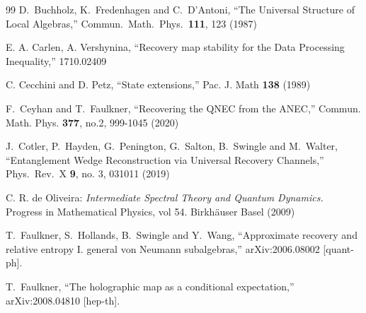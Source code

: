 \documentclass[english,a4paper,12pt]{article}
\begin{document}
\begin{thebibliography}{99}
  D.~Buchholz, K.~Fredenhagen and C.~D'Antoni,
  ``The Universal Structure of Local Algebras,''
  Commun.\ Math.\ Phys.\  {\bf 111}, 123 (1987)
  
  
  E. A. Carlen, A. Vershynina, ``Recovery map stability for the Data Processing Inequality,'' 1710.02409
  
  C. Cecchini and D. Petz, ``State extensions,'' Pac. J. Math {\bf 138} (1989)
  
  
F.~Ceyhan and T.~Faulkner,
``Recovering the QNEC from the ANEC,''
Commun. Math. Phys. \textbf{377}, no.2, 999-1045 (2020)
 
   J.~Cotler, P.~Hayden, G.~Penington, G.~Salton, B.~Swingle and M.~Walter,
  ``Entanglement Wedge Reconstruction via Universal Recovery Channels,''
  Phys.\ Rev.\ X {\bf 9}, no. 3, 031011 (2019)
  
 C. R. de Oliveira:
 {\it Intermediate Spectral Theory and Quantum Dynamics.} 
 Progress in Mathematical Physics, vol 54. Birkh\" auser Basel
 (2009)
  
  
  
T.~Faulkner, S.~Hollands, B.~Swingle and Y.~Wang,
``Approximate recovery and relative entropy I. general von Neumann subalgebras,''
arXiv:2006.08002 [quant-ph].

T.~Faulkner,
``The holographic map as a conditional expectation,''
arXiv:2008.04810 [hep-th].
  
  
  
  

\end{thebibliography}
\end{document}
